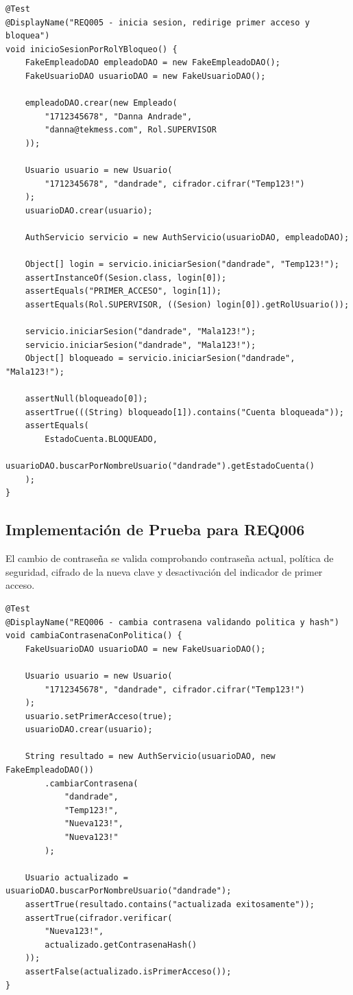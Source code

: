 \documentclass[12pt,a4paper]{article}
\begin{document}
\begin{lstlisting}[style=javaStyle, caption={Prueba de inicio de sesión por rol y bloqueo de cuenta}]
@Test
@DisplayName("REQ005 - inicia sesion, redirige primer acceso y bloquea")
void inicioSesionPorRolYBloqueo() {
    FakeEmpleadoDAO empleadoDAO = new FakeEmpleadoDAO();
    FakeUsuarioDAO usuarioDAO = new FakeUsuarioDAO();

    empleadoDAO.crear(new Empleado(
        "1712345678", "Danna Andrade",
        "danna@tekmess.com", Rol.SUPERVISOR
    ));

    Usuario usuario = new Usuario(
        "1712345678", "dandrade", cifrador.cifrar("Temp123!")
    );
    usuarioDAO.crear(usuario);

    AuthServicio servicio = new AuthServicio(usuarioDAO, empleadoDAO);

    Object[] login = servicio.iniciarSesion("dandrade", "Temp123!");
    assertInstanceOf(Sesion.class, login[0]);
    assertEquals("PRIMER_ACCESO", login[1]);
    assertEquals(Rol.SUPERVISOR, ((Sesion) login[0]).getRolUsuario());

    servicio.iniciarSesion("dandrade", "Mala123!");
    servicio.iniciarSesion("dandrade", "Mala123!");
    Object[] bloqueado = servicio.iniciarSesion("dandrade", "Mala123!");

    assertNull(bloqueado[0]);
    assertTrue(((String) bloqueado[1]).contains("Cuenta bloqueada"));
    assertEquals(
        EstadoCuenta.BLOQUEADO,
        usuarioDAO.buscarPorNombreUsuario("dandrade").getEstadoCuenta()
    );
}
\end{lstlisting}

\subsection{Implementación de Prueba para REQ006}

El cambio de contraseña se valida comprobando contraseña actual, política de seguridad, cifrado de la nueva clave y desactivación del indicador de primer acceso.

\begin{lstlisting}[style=javaStyle, caption={Prueba de cambio de contraseña}]
@Test
@DisplayName("REQ006 - cambia contrasena validando politica y hash")
void cambiaContrasenaConPolitica() {
    FakeUsuarioDAO usuarioDAO = new FakeUsuarioDAO();

    Usuario usuario = new Usuario(
        "1712345678", "dandrade", cifrador.cifrar("Temp123!")
    );
    usuario.setPrimerAcceso(true);
    usuarioDAO.crear(usuario);

    String resultado = new AuthServicio(usuarioDAO, new FakeEmpleadoDAO())
        .cambiarContrasena(
            "dandrade",
            "Temp123!",
            "Nueva123!",
            "Nueva123!"
        );

    Usuario actualizado = usuarioDAO.buscarPorNombreUsuario("dandrade");
    assertTrue(resultado.contains("actualizada exitosamente"));
    assertTrue(cifrador.verificar(
        "Nueva123!",
        actualizado.getContrasenaHash()
    ));
    assertFalse(actualizado.isPrimerAcceso());
}
\end{lstlisting}
\end{document}
